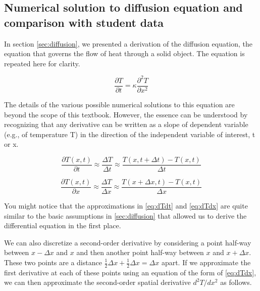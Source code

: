 \newpage

\subsection{Numerical solution to diffusion equation and comparison with student data}

In section \ref{sec:diffusion}, we presented a derivation of the diffusion equation, the equation that governs the flow of heat through a solid object. The equation is repeated here for clarity.

\begin{equation} \label{eq:diffusion_again} 
\frac{\partial T}{\partial t}=\kappa \frac{\partial ^{2}T}{\partial x^2} 
\end{equation}

The details of the various possible numerical solutions to this equation are beyond the scope of this textbook.  However, the essence can be understood by recognizing that any derivative can be written as a slope of dependent variable (e.g., of temperature T) in the direction of the independent variable of interest, t or x.

\begin{equation} \label{eq:dTdt} 
\frac{\partial T\left ( x,t \right )}{\partial t}\approx  \frac{\Delta T}{\Delta t}\approx \frac{T\left ( x,t+\Delta t \right )-T\left ( x,t \right )}{\Delta t}
\end{equation}

\begin{equation} \label{eq:dTdx} 
\frac{\partial T\left ( x,t \right )}{\partial x}\approx  \frac{\Delta T}{\Delta x}\approx \frac{T\left ( x+\Delta x,t \right )-T\left ( x,t \right )}{\Delta x}
\end{equation}

You might notice that the approximations in \ref{eq:dTdt} and \ref{eq:dTdx} are quite similar to the basic assumptions in \ref{sec:diffusion} that allowed us to derive the differential equation in the first place.

We can also discretize a second-order derivative by considering a point half-way between $x\!-\!\Delta \!x$ and ${x}$ and then another point half-way between $x$ and  $x\!+\!\Delta \!x$. These two points are a distance $\frac{1}{2}\Delta x +\frac{1}{2}\Delta x=\Delta x $ apart. If we approximate the first derivative at each of these points using an equation of the form of \ref{eq:dTdx}, we can then approximate the second-order spatial derivative $d^2T/dx^2$ as follows.


